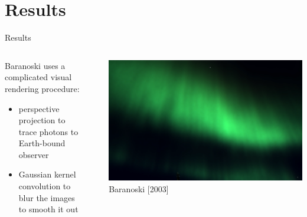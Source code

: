\documentclass[xcolor=pdftex,dvipsnames,table,usenames,11pt]{beamer}
\begin{document}
\section{Results}

\begin{frame}{Results}
\begin{columns}[onlytextwidth]
  \begin{column}{0.5\textwidth}
  Baranoski uses a complicated visual rendering procedure:
  \begin{itemize}
  \item perspective projection to trace photons to Earth-bound observer
  \item Gaussian kernel convolution to blur the images to smooth it out
  \end{itemize}
  \end{column}
  \begin{column}{0.05\textwidth}
  \end{column}
  \begin{column}{0.5\textwidth}
    \includegraphics[width=\textwidth]{img/baran_results.png}\\
	\hfill { \tiny Baranoski [2003]}
  \end{column}
\end{columns} 
\end{frame}
\end{document}

